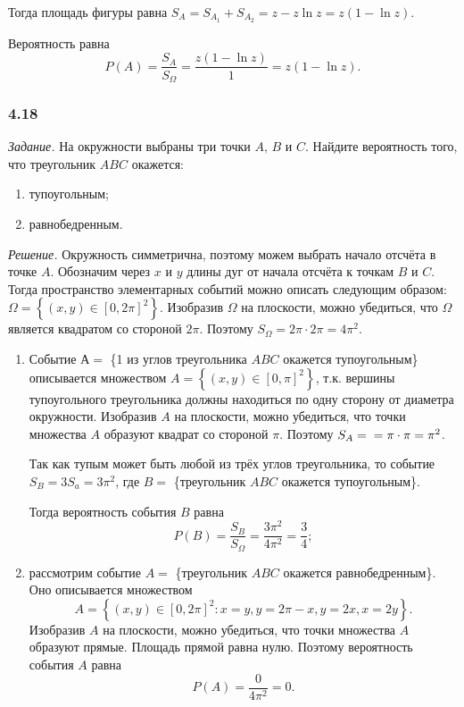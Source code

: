 \begin{enumerate}[label=\alph*)]
Тогда площадь фигуры равна $S_A = S_{A_1} + S_{A_2} = z - z \ln z = z \left( 1 - \ln z \right)$.

Вероятность равна
$$P \left( A \right) =
\frac{S_A}{S_{ \Omega }} =
\frac{z \left( 1 - \ln z \right) }{1} =
z \left( 1 - \ln z \right).$$
\end{enumerate}

\subsubsection*{4.18}

\textit{Задание.} На окружности выбраны три точки $A, \, B$ и $C$.
Найдите вероятность того, что треугольник $ABC$ окажется:
\begin{enumerate}[label=\alph*)]
\item тупоугольным;
\item равнобедренным.
\end{enumerate}

\textit{Решение.} Окружность симметрична, поэтому можем выбрать начало отсчёта в точке $A$.
Обозначим через $x$ и $y$ длины дуг от начала отсчёта к точкам $B$ и $C$.
Тогда пространство элементарных событий можно описать следующим образом:
$ \Omega =
\left\{  \left( x, y \right) \in \left[0, 2 \pi \right]^2 \right\}$.
Изобразив $ \Omega $ на плоскости, можно убедиться, что $ \Omega $ является квадратом со стороной $2 \pi$.
Поэтому $S_{ \Omega } = 2 \pi \cdot 2 \pi = 4 \pi^2$.

\begin{enumerate}[label=\alph*)]
\item Событие $А = $ \{1 из углов треугольника $ABC$ окажется тупоугольным\} описывается множеством
$A =
\left\{ \left( x, y \right) \in \left[0, \pi \right]^2 \right\}$,
т.к. вершины тупоугольного треугольника должны находиться по одну сторону от диаметра окружности.
Изобразив $A$ на плоскости, можно убедиться, что точки множества $A$ образуют квадрат со стороной $ \pi $.
Поэтому $S_A = \\ = \pi \cdot \pi = \pi^2$.

Так как тупым может быть любой из трёх углов треугольника,
то событие $S_B = 3S_a = 3 \pi^2$, где $B =$ \{треугольник $ABC$ окажется тупоугольным\}.

Тогда вероятность события $B$ равна
$$P \left( B \right) =
\frac{S_B}{S_{ \Omega }} =
\frac{3 \pi^2}{4 \pi^2} =
\frac{3}{4};$$

\item рассмотрим событие $A = $ \{треугольник $ABC$ окажется равнобедренным\}.
Оно описывается множеством 
$$A = \left\{ \left( x, y \right) \in \left[0, 2 \pi \right]^2: x = y, y = 2 \pi - x, y = 2x, x = 2y \right\}.$$
Изобразив $A$ на плоскости, можно убедиться, что точки множества $A$ образуют прямые.
Площадь прямой равна нулю.
Поэтому вероятность события $A$ равна
$$P \left( A \right) =
\frac{0}{4 \pi^2} =
0.$$
\end{enumerate}

